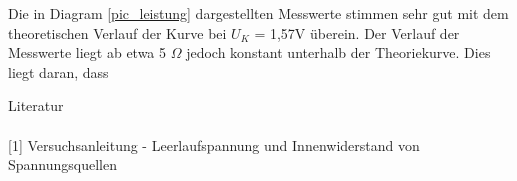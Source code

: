 Die in Diagram \ref{pic_leistung} dargestellten Messwerte stimmen sehr gut mit dem theoretischen Verlauf der Kurve bei $U_K$ = 1,57V überein. Der Verlauf der Messwerte liegt ab etwa 5 $\Omega$ jedoch konstant unterhalb der Theoriekurve. Dies liegt daran, dass  


\parskip 180pt
\Large{Literatur}\\\\
\large{[1] Versuchsanleitung - Leerlaufspannung und Innenwiderstand von Spannungsquellen}\\\\




